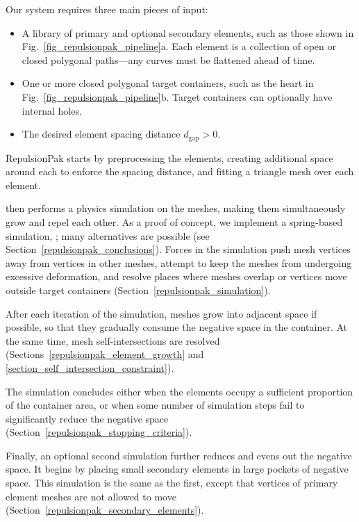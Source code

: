 Our system requires three main pieces of input:
\begin{itemize}
	\item A library of primary and optional secondary elements, such
		as those shown in Fig.~\ref{fig_repulsionpak_pipeline}a.
	      Each element is a collection of 
		  open or closed polygonal paths---any curves must
		  be flattened ahead of time.
	\item One or more closed polygonal target containers, such as the
		heart in Fig.~\ref{fig_repulsionpak_pipeline}b.  Target containers can optionally
		have internal holes.
	\item The desired element spacing distance $d_\mathrm{gap}>0$.
\end{itemize}

RepulsionPak starts by preprocessing the elements, creating additional space around
each to enforce the spacing distance, and fitting a triangle mesh over each element.

 then performs a physics simulation on the meshes, 
making them simultaneously grow and repel each other. As a
proof of concept, we implement a spring-based 
simulation, ;
many alternatives are possible 
(see Section~\ref{repulsionpak_conclusions}).
Forces in the
simulation push mesh vertices away from vertices in other meshes,
attempt to keep the meshes from undergoing excessive deformation, and resolve
places where meshes overlap or vertices move outside target containers
(Section~\ref{repulsionpak_simulation}).

After each iteration of the simulation, meshes grow into adjacent space
if possible, so that they gradually consume the negative space in the container.
At the same time, mesh self-intersections are resolved
(Sections~\ref{repulsionpak_element_growth} and \ref{section_self_intersection_constraint}).

The simulation concludes 
either when the elements occupy a sufficient proportion of the container area, or 
when some number of simulation steps fail to
significantly reduce the negative space
(Section~\ref{repulsionpak_stopping_criteria}).

Finally, an optional second simulation further reduces and evens out the
negative space.  It begins by placing small secondary elements in large
pockets of negative space.  This simulation is the same as the
first, except that vertices of primary element meshes are not allowed to move
(Section~\ref{repulsionpak_secondary_elements}).

